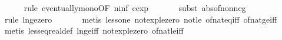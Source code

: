 \begin{isabellebody}
\ \ \ \ \isamarkupfalse%
\ {\isacharparenleft}{\kern0pt}rule\ eventually{\isacharunderscore}{\kern0pt}mono{\isacharbrackleft}{\kern0pt}OF\ n{\isacharunderscore}{\kern0pt}inf{\isacharbrackleft}{\kern0pt}\ c{\isacharequal}{\kern0pt}{\isachardoublequoteopen}exp\ {}{\isachardoublequoteclose}{\isacharbrackright}{\kern0pt}{\isacharbrackright}{\kern0pt}{\isacharparenright}{\kern0pt}\isanewline
\ \ \ \ \isamarkupfalse%
\ {\isacharparenleft}{\kern0pt}subst\ abs{\isacharunderscore}{\kern0pt}of{\isacharunderscore}{\kern0pt}nonneg{\isacharparenright}{\kern0pt}\isanewline
\ \ \ \ \isamarkupfalse%
\ {\isacharparenleft}{\kern0pt}rule\ ln{\isacharunderscore}{\kern0pt}ge{\isacharunderscore}{\kern0pt}zero{\isacharparenright}{\kern0pt}\isanewline
\ \ \ \ \ \isamarkupfalse%
\ {\isacharparenleft}{\kern0pt}metis\ less{\isacharunderscore}{\kern0pt}one\ not{\isacharunderscore}{\kern0pt}exp{\isacharunderscore}{\kern0pt}le{\isacharunderscore}{\kern0pt}zero\ not{\isacharunderscore}{\kern0pt}le\ of{\isacharunderscore}{\kern0pt}nat{\isacharunderscore}{\kern0pt}eq{\isacharunderscore}{\kern0pt}{}{\isacharunderscore}{\kern0pt}iff\ of{\isacharunderscore}{\kern0pt}nat{\isacharunderscore}{\kern0pt}ge{\isacharunderscore}{\kern0pt}{}{\isacharunderscore}{\kern0pt}iff{\isacharparenright}{\kern0pt}\isanewline
\ \ \ \ \isamarkupfalse%
\ {\isacharparenleft}{\kern0pt}metis\ less{\isacharunderscore}{\kern0pt}eq{\isacharunderscore}{\kern0pt}real{\isacharunderscore}{\kern0pt}def\ ln{\isacharunderscore}{\kern0pt}ge{\isacharunderscore}{\kern0pt}iff\ not{\isacharunderscore}{\kern0pt}exp{\isacharunderscore}{\kern0pt}le{\isacharunderscore}{\kern0pt}zero\ of{\isacharunderscore}{\kern0pt}nat{\isacharunderscore}{\kern0pt}{}{\isacharunderscore}{\kern0pt}le{\isacharunderscore}{\kern0pt}iff{\isacharparenright}{\kern0pt}\isanewline
\isanewline
\ \ \isamarkupfalse%

\end{isabellebody}
